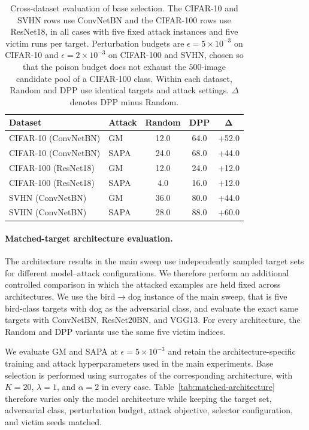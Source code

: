 \begin{table}[t]
\centering
\caption{
Cross-dataset evaluation of base selection. The CIFAR-10 and SVHN rows
use ConvNetBN and the CIFAR-100 rows use ResNet18, in all cases with
five fixed attack instances and five victim runs per target.
Perturbation budgets are $\epsilon=5\times10^{-3}$ on CIFAR-10 and
$\epsilon=2\times10^{-3}$ on CIFAR-100 and SVHN, chosen so that the
poison budget does not exhaust the $500$-image candidate pool of a
CIFAR-100 class. Within each dataset, Random and DPP use identical
targets and attack settings. $\Delta$ denotes DPP minus Random.
}
\label{tab:cross-dataset}
\small
\setlength{\tabcolsep}{7pt}
\renewcommand{\arraystretch}{1.08}
\begin{tabular}{llccc}
\toprule
\textbf{Dataset} &
\textbf{Attack} &
\textbf{Random} &
\textbf{DPP} &
$\boldsymbol{\Delta}$ \\
\midrule
CIFAR-10 \small{(ConvNetBN)}     & GM   & 12.0 & 64.0 & +52.0 \\
CIFAR-10 \small{(ConvNetBN)}     & SAPA & 24.0 & 68.0 & +44.0 \\
\midrule
CIFAR-100 \small{(ResNet18)}      & GM   & 12.0 & 24.0 & +12.0 \\
CIFAR-100 \small{(ResNet18)}      & SAPA & 4.0 & 16.0 & +12.0 \\
\midrule
SVHN \small{(ConvNetBN)}          & GM   & 36.0 & 80.0 & +44.0 \\
SVHN \small{(ConvNetBN)}          & SAPA & 28.0 & 88.0 & +60.0 \\
\bottomrule
\end{tabular}
\end{table}


\paragraph{Matched-target architecture evaluation.}
The architecture results in the main sweep use independently sampled
target sets for different model--attack configurations. We therefore
perform an additional controlled comparison in which the attacked
examples are held fixed across architectures. We use the
bird$\rightarrow$dog instance of the main sweep, that is five bird-class
targets with dog as the adversarial class, and evaluate the exact same
targets with ConvNetBN, ResNet20BN, and VGG13. For every architecture,
the Random and DPP variants use the same five victim indices.

We evaluate GM and SAPA at
$\epsilon=5\times10^{-3}$ and retain the architecture-specific training
and attack hyperparameters used in the main experiments. Base selection
is performed using surrogates of the corresponding architecture, with
$K=20$, $\lambda=1$, and $\alpha=2$ in every case.
Table~\ref{tab:matched-architecture} therefore varies only the model
architecture while keeping the target set, adversarial class,
perturbation budget, attack objective, selector configuration, and
victim seeds matched.

